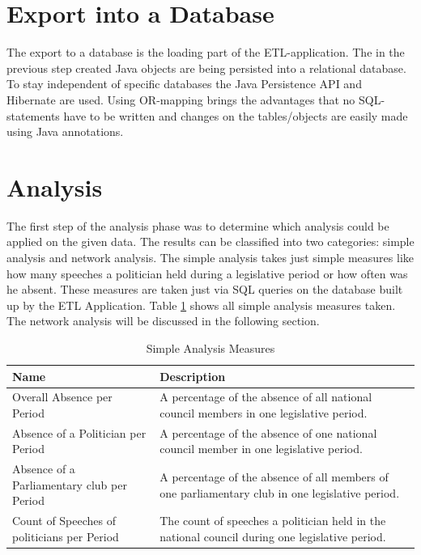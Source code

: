 \section{Export into a Database}
\label{sec:export_db}
The export to a database is the loading part of the ETL-application. The in the previous step created Java objects are being persisted into a relational database. To stay independent of specific databases the Java Persistence API and Hibernate are used. Using OR-mapping brings the advantages that no SQL-statements have to be written and changes on the tables/objects are easily made using Java annotations.

\section{Analysis}
\label{sec:analysis}
The first step of the analysis phase was to determine which analysis could be applied on the given data. The results can be classified into two categories: simple analysis and network analysis. The simple analysis takes just simple measures like how many speeches a politician held during a legislative period or how often was he absent. These measures are taken just via SQL queries on the database built up by the ETL Application. Table \ref{table:simple_analysis} shows all simple analysis measures taken. The network analysis will be discussed in the following section.

\begin{table}
\begin{tabular}{| p{5cm} | p{8cm} |}
\hline
  Name & Description \\
\hline
\hline
  Overall Absence per Period & A percentage of the absence of all national council members in one legislative period. \\
\hline
Absence of a Politician per Period & A percentage of the absence of one national council member in one legislative period. \\
\hline
Absence of a Parliamentary club per Period & A percentage of the absence of all members of one parliamentary club in one legislative period. \\
\hline
Count of Speeches of politicians per Period & The count of speeches a politician held in the national council during one legislative period. \\
\hline

\end{tabular}

\caption{Simple Analysis Measures}
\label{table:simple_analysis}
\end{table}

